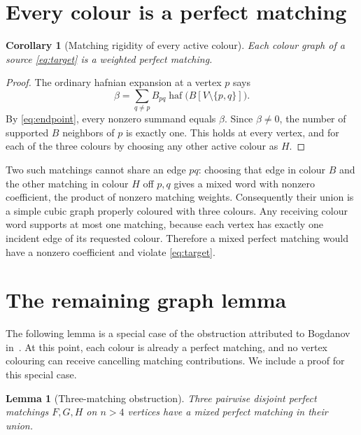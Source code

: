 \documentclass[11pt]{article}
\newtheorem{lemma}[theorem]{Lemma}
\newtheorem{corollary}[theorem]{Corollary}
\theoremstyle{definition}
\theoremstyle{plain}
\numberwithin{equation}{section}
\begin{document}
\section{Every colour is a perfect matching}\label{sec:matching}

\begin{corollary}[Matching rigidity of every active colour]\label{cor:matching}
Each colour graph of a source \eqref{eq:target} is a weighted perfect matching.
\end{corollary}

\begin{proof}
The ordinary hafnian expansion at a vertex \(p\) says
\[
 \beta=\sum_{q\ne p}B_{pq}\operatorname{haf}\bigl(B[V\setminus\{p,q\}]\bigr).
\]
By \eqref{eq:endpoint}, every nonzero summand equals \(\beta\). Since
\(\beta\ne0\), the number of supported \(B\) neighbors of \(p\) is exactly
one. This holds at every vertex, and for each of the three colours by choosing
any other active colour as \(H\).
\end{proof}

Two such matchings cannot share an edge \(pq\): choosing that edge in colour
\(B\) and the other matching in colour \(H\) off \(p,q\) gives a mixed word
with nonzero coefficient, the product of nonzero matching weights.
Consequently their union is a simple cubic graph properly coloured with three
colours. Any receiving colour word supports at most one matching, because each
vertex has exactly one incident edge of its requested colour. Therefore a
mixed perfect matching would have a nonzero coefficient and violate
\eqref{eq:target}.

\section{The remaining graph lemma}\label{sec:graph}

The following lemma is a special case of the obstruction attributed to
Bogdanov in~\cite[Theorem~7]{cgi}. At this point, each colour is already a
perfect matching, and no vertex colouring can receive cancelling matching
contributions. We include a proof for this special case.

\begin{lemma}[Three-matching obstruction]\label{lem:graph}
Three pairwise disjoint perfect matchings \(F,G,H\) on \(n>4\) vertices
have a mixed perfect matching in their union.
\end{lemma}
\end{document}
